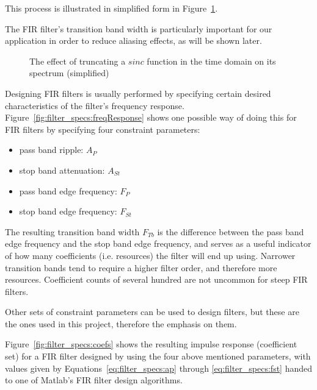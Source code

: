 This     process     is     illustrated      in     simplified     form     in
Figure~\ref{fig:brick_wall_vs_FIR}.

The  FIR filter's  transition band  width  is particularly  important for  our
application in order to reduce aliasing effects, as will be shown later.

\begin{figure}
    \centering
    
    \caption[Brick Wall Filter vs. FIR Filter (simplified)]{%
        The effect of  truncating a $sinc$ function in the  time domain on its
        spectrum (simplified)%
    }
    \label{fig:brick_wall_vs_FIR}
\end{figure}

Designing    FIR    filters    is     usually    performed    by    specifying
certain     desired    characteristics     of    the     filter's    frequency
response. Figure~\ref{fig:filter_specs:freqResponse} shows one possible way of
doing this for FIR filters by specifying four constraint parameters:
\begin{itemize}\tightlist
    \item
        pass band ripple: $A_P$
    \item
        stop band attenuation: $A_{St}$
    \item
        pass band edge frequency: $F_P$
    \item
        stop band edge frequency: $F_{St}$
\end{itemize}

The resulting  transition band  width $F_{Tb}$ is  the difference  between the
pass band  edge frequency and  the stop band edge  frequency, and serves  as a
useful indicator of how many coefficients (i.e. resources) the filter will end
up using. Narrower transition bands tend to require a higher filter order, and
therefore  more  resources. Coefficient  counts  of several  hundred  are  not
uncommon for steep FIR filters.

Other sets of  constraint parameters can be used to  design filters, but these
are the ones used in this project, therefore the emphasis on them.

Figure~\ref{fig:filter_specs:coefs}  shows  the   resulting  impulse  response
(coefficient  set)  for  a  FIR  filter  designed  by  using  the  four  above
mentioned parameters, with  values given by Equations~\ref{eq:filter_specs:ap}
through \ref{eq:filter_specs:fst} handed to one  of Matlab's FIR filter design
algorithms.

